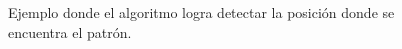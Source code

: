 \begin{figure}
	\caption{Ejemplo donde el algoritmo logra detectar la posición donde se encuentra el patrón.} \label{fig:success-example-experiment}
\end{figure}

